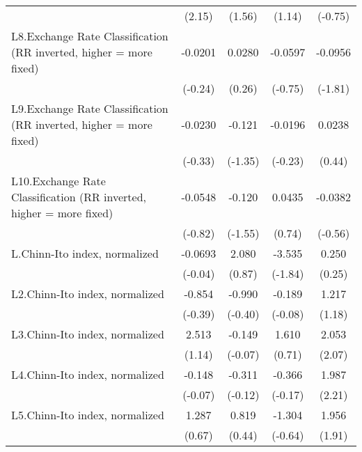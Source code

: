 {\begin{longtable}{l*{4}{c}}
                &   (2.15)         &   (1.56)         &   (1.14)         &  (-0.75)         \\
\addlinespace
L8.Exchange Rate Classification (RR inverted, higher = more fixed)&  -0.0201         &   0.0280         &  -0.0597         &  -0.0956         \\
                &  (-0.24)         &   (0.26)         &  (-0.75)         &  (-1.81)         \\
\addlinespace
L9.Exchange Rate Classification (RR inverted, higher = more fixed)&  -0.0230         &   -0.121         &  -0.0196         &   0.0238         \\
                &  (-0.33)         &  (-1.35)         &  (-0.23)         &   (0.44)         \\
\addlinespace
L10.Exchange Rate Classification (RR inverted, higher = more fixed)&  -0.0548         &   -0.120         &   0.0435         &  -0.0382         \\
                &  (-0.82)         &  (-1.55)         &   (0.74)         &  (-0.56)         \\
\addlinespace
L.Chinn-Ito index, normalized&  -0.0693         &    2.080         &   -3.535         &    0.250         \\
                &  (-0.04)         &   (0.87)         &  (-1.84)         &   (0.25)         \\
\addlinespace
L2.Chinn-Ito index, normalized&   -0.854         &   -0.990         &   -0.189         &    1.217         \\
                &  (-0.39)         &  (-0.40)         &  (-0.08)         &   (1.18)         \\
\addlinespace
L3.Chinn-Ito index, normalized&    2.513         &   -0.149         &    1.610         &    2.053\sym{*}  \\
                &   (1.14)         &  (-0.07)         &   (0.71)         &   (2.07)         \\
\addlinespace
L4.Chinn-Ito index, normalized&   -0.148         &   -0.311         &   -0.366         &    1.987\sym{*}  \\
                &  (-0.07)         &  (-0.12)         &  (-0.17)         &   (2.21)         \\
\addlinespace
L5.Chinn-Ito index, normalized&    1.287         &    0.819         &   -1.304         &    1.956         \\
                &   (0.67)         &   (0.44)         &  (-0.64)         &   (1.91)         \\

\end{longtable}}
